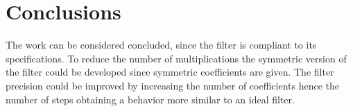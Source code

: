 \section{Conclusions}
The work can be considered concluded, since the filter is compliant to its specifications. To reduce the number of multiplications the symmetric version of the filter could be developed since symmetric coefficients are given. The filter precision could be improved by increasing the number of coefficients hence the number of steps obtaining a behavior more similar to an ideal filter. 